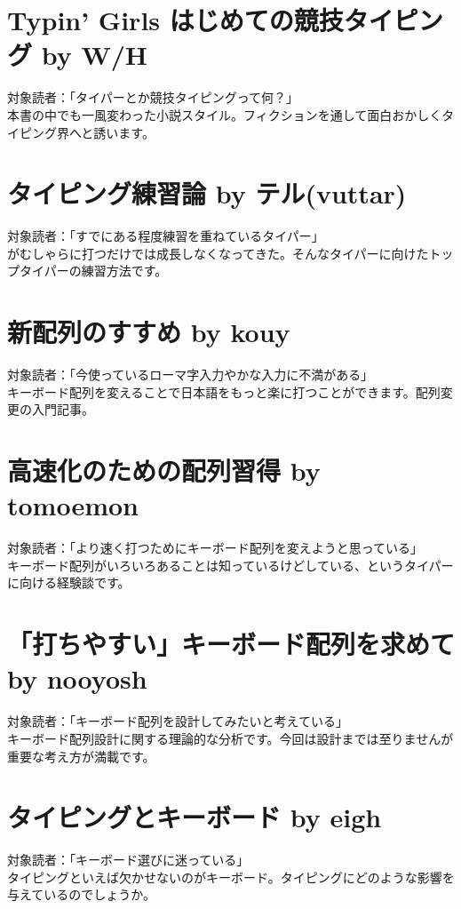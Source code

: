 \section*{Typin' Girls はじめての競技タイピング \small{by W/H}}
\noindent 対象読者：「タイパーとか競技タイピングって何？」\\
本書の中でも一風変わった小説スタイル。フィクションを通して面白おかしくタイピング界へと誘います。

\section*{タイピング練習論 \small{by テル(vuttar)}}
\noindent 対象読者：「すでにある程度練習を重ねているタイパー」\\
がむしゃらに打つだけでは成長しなくなってきた。そんなタイパーに向けたトップタイパーの練習方法です。

\section*{新配列のすすめ \small{by kouy}}
\noindent 対象読者：「今使っているローマ字入力やかな入力に不満がある」\\
キーボード配列を変えることで日本語をもっと楽に打つことができます。配列変更の入門記事。

\section*{高速化のための配列習得 \small{by tomoemon}}
\noindent 対象読者：「より速く打つためにキーボード配列を変えようと思っている」\\
キーボード配列がいろいろあることは知っているけどしている、というタイパーに向ける経験談です。

\section*{「打ちやすい」キーボード配列を求めて \small{by nooyosh}}
\noindent 対象読者：「キーボード配列を設計してみたいと考えている」\\
キーボード配列設計に関する理論的な分析です。今回は設計までは至りませんが重要な考え方が満載です。

\section*{タイピングとキーボード \small{by eigh}}
\noindent 対象読者：「キーボード選びに迷っている」\\
タイピングといえば欠かせないのがキーボード。タイピングにどのような影響を与えているのでしょうか。

